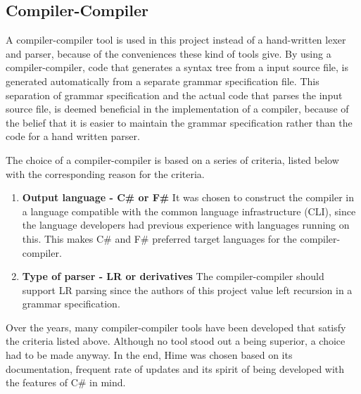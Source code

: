 \subsection{Compiler-Compiler}
\label{sec:compiler_compiler_choice}

A compiler-compiler tool is used in this project instead of a hand-written lexer and parser, because of the conveniences these kind of tools give. By using a compiler-compiler, code that generates a syntax tree from a input source file, is generated automatically from a separate grammar specification file. This separation of grammar specification and the actual code that parses the input source file, is deemed beneficial in the implementation of a compiler, because of the belief that it is easier to maintain the grammar specification rather than the code for a hand written parser.



The choice of a compiler-compiler is based on a series of criteria, listed below with the corresponding reason for the criteria.

\begin{enumerate}
\item \textbf{Output language - C\# or F\#} It was chosen to construct the compiler in a language compatible with the common language infrastructure (CLI), since the language developers had previous experience with languages running on this. This makes C\# and F\# preferred target languages for the compiler-compiler.

\item \textbf{Type of parser - LR or derivatives} The compiler-compiler should support LR parsing since the authors of this project value left recursion in a grammar specification.\\ 

\end{enumerate}

Over the years, many compiler-compiler tools have been developed that satisfy the criteria listed above. Although no tool stood out a being superior, a choice had to be made anyway. In the end, Hime was chosen based on its documentation, frequent rate of updates and its spirit of being developed with the features of C\# in mind.

